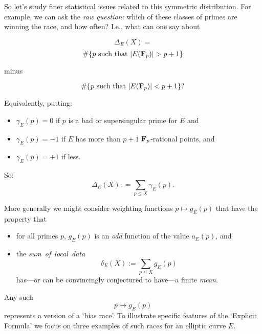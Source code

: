 \documentclass[12pt]{beamer}
\theoremstyle{definition}
\begin{document}
\begin{frame}
 \vskip40pt {\Large   So let's study  finer statistical issues related to this symmetric distribution.   For example,  we can ask the {\it raw question:}  which of these classes of primes are winning the race, and how often? I.e., what can one say about   }  \end{frame}

\begin{frame}
 \vskip40pt {\Large  
 $$\Delta_E(X) =$$  \vskip20pt $$ \#\{p \ {\rm such\ that\ } |E({\bf F}_p)| > p+1\}$$ \vskip10pt \centerline{minus} \vskip10pt  $$ \#\{p \ {\rm such\ that\ } |E({\bf F}_p)| < p+1\}?$$}  \end{frame}

\begin{frame}
 \vskip40pt {\Large  Equivalently, putting:\begin{itemize} \item $\gamma_E(p)=0$ if $p$ is a bad or supersingular prime for $E$ and\vskip20pt \item $\gamma_E(p)= -1$ if $E$ has more than $p+1$  ${\bf F}_p$-rational points, and \vskip20pt \item $\gamma_E(p) = +1$ if less.\end{itemize}}\end{frame}\begin{frame}\vskip20pt
{\Large \vskip40pt 
 So:\vskip20pt
   $$\Delta_E(X): =\sum_{p\le X}\gamma_E(p).$$
 
 
 More generally we might consider  weighting functions $p \mapsto g_E(p)$ that have the property that }  \end{frame}\begin{frame}\vskip20pt
{\Large \vskip40pt 
\begin{itemize} \item for all primes $p$, $g_E(p)$ is an {\it odd} function of the value  $a_E(p)$, and \vskip20pt \item the {\it sum\ of\ local\ data}  $$\delta_E(X):=\sum_{p\le X}g_E(p)$$ has---or can be convincingly conjectured to have---a finite  {\it mean}.\end{itemize}}\end{frame}
\begin{frame}\vskip20pt
{\Large \vskip40pt 
Any such  $$p \mapsto  g_E(p)$$ represents a version of a `bias race'.
\vskip20pt
To illustrate specific features of the `Explicit Formula' we focus on three examples of such races for an elliptic curve $E$. }\end{frame}
\end{document}
